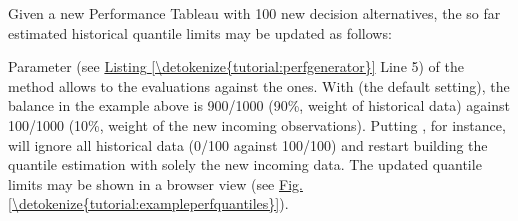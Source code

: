 \documentclass[a4paper,12pt,english]{sphinxhowto}
\begin{document}
Given a new Performance Tableau with 100 new decision alternatives, the so far estimated historical quantile limits may be updated as follows:
\def\sphinxLiteralBlockLabel{\label{\detokenize{tutorial:perfgenerator}}}
\begin{sphinxVerbatim}[commandchars=\\\{\},numbers=left,firstnumber=1,stepnumber=1]
   
  
  
\end{sphinxVerbatim}

Parameter  (see \hyperref[\detokenize{tutorial:perfgenerator}]{Listing \ref{\detokenize{tutorial:perfgenerator}}} Line 5) of the  method allows to  the  evaluations against the  ones. With  (the default setting), the balance in the example above is 900/1000 (90\%, weight of historical data) against 100/1000 (10\%, weight of the new incoming observations). Putting , for instance, will ignore all historical data (0/100 against 100/100) and restart building the quantile estimation with solely the new incoming data. The updated quantile limits may be shown in a browser view (see \hyperref[\detokenize{tutorial:exampleperfquantiles}]{Fig.\@ \ref{\detokenize{tutorial:exampleperfquantiles}}}).

\begin{sphinxVerbatim}[commandchars=\\\{\},numbers=left,firstnumber=1,stepnumber=1]
\end{sphinxVerbatim}
\end{document}
